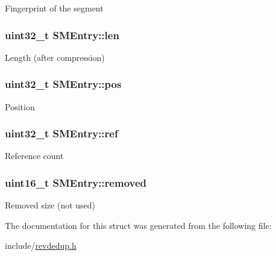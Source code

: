 \-Fingerprint of the segment \hypertarget{structSMEntry_a00e9a58c206ca0f7c7e048e0dee79e88}{
\subsubsection[{len}]{\setlength{\rightskip}{0pt plus 5cm}uint32\-\_\-t {\bf \-S\-M\-Entry\-::len}}}\label{structSMEntry_a00e9a58c206ca0f7c7e048e0dee79e88}
\-Length (after compression) \hypertarget{structSMEntry_a07ad56746a45bda3fd1398f4dfb0b71b}{
\subsubsection[{pos}]{\setlength{\rightskip}{0pt plus 5cm}uint32\-\_\-t {\bf \-S\-M\-Entry\-::pos}}}\label{structSMEntry_a07ad56746a45bda3fd1398f4dfb0b71b}
\-Position \hypertarget{structSMEntry_a924dca451023f2e5397765e59510b077}{
\subsubsection[{ref}]{\setlength{\rightskip}{0pt plus 5cm}uint32\-\_\-t {\bf \-S\-M\-Entry\-::ref}}}\label{structSMEntry_a924dca451023f2e5397765e59510b077}
\-Reference count \hypertarget{structSMEntry_a9c29e41b9d1bc3578c61e5d749a4877a}{
\subsubsection[{removed}]{\setlength{\rightskip}{0pt plus 5cm}uint16\-\_\-t {\bf \-S\-M\-Entry\-::removed}}}\label{structSMEntry_a9c29e41b9d1bc3578c61e5d749a4877a}
\-Removed size (not used) 

\-The documentation for this struct was generated from the following file\-:\begin{DoxyCompactItemize}
\item 
include/\hyperlink{revdedup_8h}{revdedup.\-h}\end{DoxyCompactItemize}
